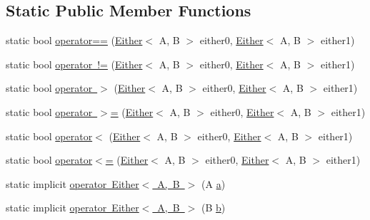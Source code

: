 \subsection*{Static Public Member Functions}
\begin{DoxyCompactItemize}
\item 
static bool \mbox{\hyperlink{struct_leap_1_1_unity_1_1_either_ac635dd45bbe22cd73bb1c850d7294087}{operator==}} (\mbox{\hyperlink{struct_leap_1_1_unity_1_1_either}{Either}}$<$ A, B $>$ either0, \mbox{\hyperlink{struct_leap_1_1_unity_1_1_either}{Either}}$<$ A, B $>$ either1)
\item 
static bool \mbox{\hyperlink{struct_leap_1_1_unity_1_1_either_ac30ec0b03336fd8a86a119c60889cebf}{operator !=}} (\mbox{\hyperlink{struct_leap_1_1_unity_1_1_either}{Either}}$<$ A, B $>$ either0, \mbox{\hyperlink{struct_leap_1_1_unity_1_1_either}{Either}}$<$ A, B $>$ either1)
\item 
static bool \mbox{\hyperlink{struct_leap_1_1_unity_1_1_either_ae6ef9429d3c8ef042af9ca7c798aeb76}{operator $>$}} (\mbox{\hyperlink{struct_leap_1_1_unity_1_1_either}{Either}}$<$ A, B $>$ either0, \mbox{\hyperlink{struct_leap_1_1_unity_1_1_either}{Either}}$<$ A, B $>$ either1)
\item 
static bool \mbox{\hyperlink{struct_leap_1_1_unity_1_1_either_ae181b781714ebcac842831560838a723}{operator $>$=}} (\mbox{\hyperlink{struct_leap_1_1_unity_1_1_either}{Either}}$<$ A, B $>$ either0, \mbox{\hyperlink{struct_leap_1_1_unity_1_1_either}{Either}}$<$ A, B $>$ either1)
\item 
static bool \mbox{\hyperlink{struct_leap_1_1_unity_1_1_either_ab37b777230207b8c28d6dd31a3973d31}{operator$<$}} (\mbox{\hyperlink{struct_leap_1_1_unity_1_1_either}{Either}}$<$ A, B $>$ either0, \mbox{\hyperlink{struct_leap_1_1_unity_1_1_either}{Either}}$<$ A, B $>$ either1)
\item 
static bool \mbox{\hyperlink{struct_leap_1_1_unity_1_1_either_a8f0100a083842f17c4fb7264168a98bd}{operator$<$=}} (\mbox{\hyperlink{struct_leap_1_1_unity_1_1_either}{Either}}$<$ A, B $>$ either0, \mbox{\hyperlink{struct_leap_1_1_unity_1_1_either}{Either}}$<$ A, B $>$ either1)
\item 
static implicit \mbox{\hyperlink{struct_leap_1_1_unity_1_1_either_aad4cf5d2660fccc66c7fb8af73670645}{operator Either$<$ A, B $>$}} (A \mbox{\hyperlink{struct_leap_1_1_unity_1_1_either_ac7c612037b34bbfb23251111dae09928}{a}})
\item 
static implicit \mbox{\hyperlink{struct_leap_1_1_unity_1_1_either_aad64b8a106656a151294f1e5f9c70aef}{operator Either$<$ A, B $>$}} (B \mbox{\hyperlink{struct_leap_1_1_unity_1_1_either_aaa579850040ea7c13ab798269e23fd0c}{b}})
\end{DoxyCompactItemize}
